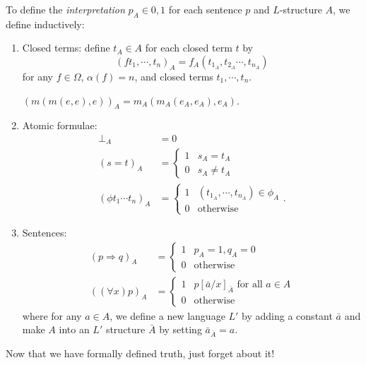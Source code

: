 \documentclass[a4paper]{article}
\begin{document}
\begin{defi}[Interpretation]
  To define the \emph{interpretation} $p_A\in {0, 1}$ for each sentence $p$ and $L$-structure $A$, we define inductively:
  \begin{enumerate}
    \item Closed terms: define $t_A\in A$ for each closed term $t$ by
      \[
        (ft_1, \cdots, t_n)_A = f_A(t_{1_A}, t_{2_A}\cdots, t_{n_A})
      \]
      for any $f\in \Omega$, $\alpha(f) = n$, and closed terms $t_1, \cdots, t_n$.

      \begin{eg}
        $(m(m(e,e),e))_A = m_A(m_A(e_A, e_A),e_A)$.
      \end{eg}
    \item Atomic formulae:
      \begin{align*}
        \bot_A &= 0\\
        (s = t)_A &=
        \begin{cases}
          1 & s_A = t_A\\
          0 & s_A \not= t_A
        \end{cases}\\
        (\phi t_1 \cdots t_n)_A &=
        \begin{cases}
          1 & (t_{1_A}, \cdots, t_{n_A})\in \phi_A \\
          0 & \text{otherwise}
        \end{cases}.
      \end{align*}
    \item Sentences:
      \begin{align*}
        (p\Rightarrow q)_A &=
        \begin{cases}
          1 & p_A = 1, q_A = 0\\
          0 & \text{otherwise}
        \end{cases}\\
        ((\forall x)p)_A &=
        \begin{cases}
          1 & p[\bar a/x]_{\bar A} \text{ for all }a\in A\\
          0 & \text{otherwise}
        \end{cases}
      \end{align*}
      where for any $a\in A$, we define a new language $L'$ by adding a constant $\bar a$ and make $A$ into an $L'$ structure $\bar A$ by setting $\bar a_{\bar A} = a$.
  \end{enumerate}
\end{defi}
Now that we have formally defined truth, just forget about it!
\end{document}
